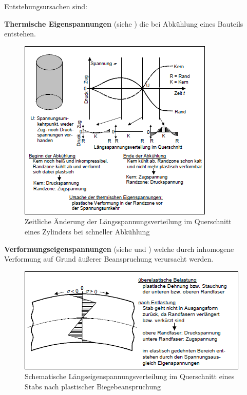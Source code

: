 \documentclass[12pt,a4paper,parskip,twoside,BCOR5mm,headsepline]{scrartcl}
\begin{document}
\begin{description*}
{Entstehungsursachen sind:
\begin{itemize*}
\item \textbf{Thermische Eigenspannungen} (siehe ) die bei Abkühlung eines Bauteils entstehen.\begin{figure}
  \centering
  \includegraphics[width=.8\textwidth] {eigenspanabk}
  \caption[Spannungsverteilung eines Zylinders]{Zeitliche Änderung der Längsspannungsverteilung im Querschnitt eines Zylinders bei schneller Abkühlung\autocite[34]{hu}}
  \label{fig:eigenspanabk}
  \end{figure}
  

\item \textbf{Verformungseigenspannungen} (siehe  und ) welche durch inhomogene Verformung auf Grund äußerer Beanspruchung verursacht werden.\begin{figure}
  \centering
  \includegraphics[width=.8\textwidth]{eigenspanfaser}
  \caption[Längseigenspannungsverteilung eines Stabquerschnittes]{Schematische Längseigenspannungsverteilung im Querschnitt eines Stabs nach plastischer Biegebeanspruchung   \autocite[34]{hu}}
  \label{fig:eigenspanfaser}
  \end{figure}


\end{itemize*}}
\end{description*}
\end{document}
